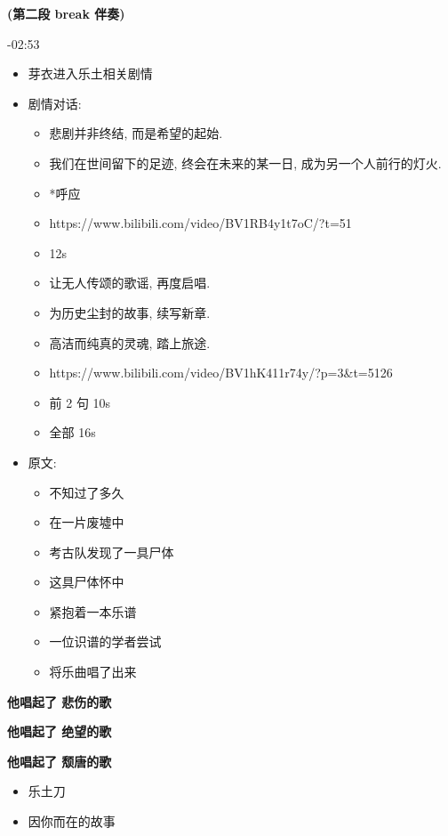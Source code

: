 \documentclass[a4paper]{article}
\begin{document}
\textbf{(第二段 break 伴奏)}

-02:53

\begin{itemize}
    \item 芽衣进入乐土相关剧情
    \item 剧情对话:
    \begin{itemize}
        \item 悲剧并非终结, 而是希望的起始.
        \item 我们在世间留下的足迹, 终会在未来的某一日, 成为另一个人前行的灯火.
        \item *呼应
        \item https://www.bilibili.com/video/BV1RB4y1t7oC/?t=51
        \item 12s
    \end{itemize}
    \begin{itemize}
        \item 让无人传颂的歌谣, 再度启唱.
        \item 为历史尘封的故事, 续写新章.
        \item 高洁而纯真的灵魂, 踏上旅途.
        \item https://www.bilibili.com/video/BV1hK411r74y/?p=3&t=5126
        \item 前 2 句 10s
        \item 全部 16s
    \end{itemize}
    \item 原文:
    \begin{itemize}
        \item 不知过了多久
        \item 在一片废墟中
        \item 考古队发现了一具尸体
        \item 这具尸体怀中
        \item 紧抱着一本乐谱
        \item 一位识谱的学者尝试
        \item 将乐曲唱了出来
    \end{itemize}
\end{itemize}

\textbf{他唱起了 悲伤的歌}

\textbf{他唱起了 绝望的歌}

\textbf{他唱起了 颓唐的歌}

\begin{itemize}
    \item 乐土刀
    \item 因你而在的故事
\end{itemize}
\end{document}
